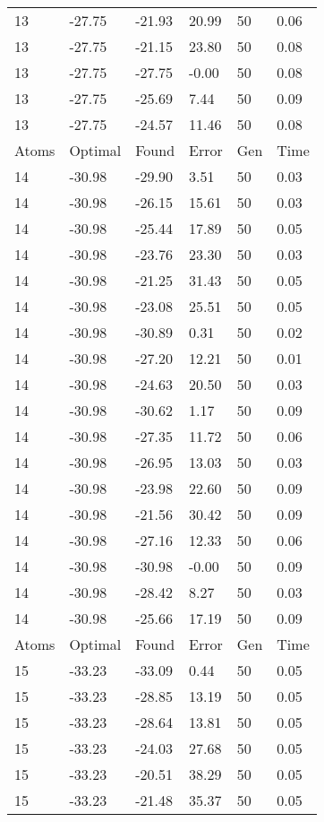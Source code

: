 \documentclass{report}
\begin{document}
\begin{appendix}
\begin{longtable}{llllll}
13 & -27.75 & -21.93 & 20.99 & 50 & 0.06 \\
13 & -27.75 & -21.15 & 23.80 & 50 & 0.08 \\
13 & -27.75 & -27.75 & -0.00 & 50 & 0.08 \\
13 & -27.75 & -25.69 & 7.44 & 50 & 0.09 \\
13 & -27.75 & -24.57 & 11.46 & 50 & 0.08 \\
Atoms & Optimal & Found & Error & Gen & Time \\
14 & -30.98 & -29.90 & 3.51 & 50 & 0.03 \\
14 & -30.98 & -26.15 & 15.61 & 50 & 0.03 \\
14 & -30.98 & -25.44 & 17.89 & 50 & 0.05 \\
14 & -30.98 & -23.76 & 23.30 & 50 & 0.03 \\
14 & -30.98 & -21.25 & 31.43 & 50 & 0.05 \\
14 & -30.98 & -23.08 & 25.51 & 50 & 0.05 \\
14 & -30.98 & -30.89 & 0.31 & 50 & 0.02 \\
14 & -30.98 & -27.20 & 12.21 & 50 & 0.01 \\
14 & -30.98 & -24.63 & 20.50 & 50 & 0.03 \\
14 & -30.98 & -30.62 & 1.17 & 50 & 0.09 \\
14 & -30.98 & -27.35 & 11.72 & 50 & 0.06 \\
14 & -30.98 & -26.95 & 13.03 & 50 & 0.03 \\
14 & -30.98 & -23.98 & 22.60 & 50 & 0.09 \\
14 & -30.98 & -21.56 & 30.42 & 50 & 0.09 \\
14 & -30.98 & -27.16 & 12.33 & 50 & 0.06 \\
14 & -30.98 & -30.98 & -0.00 & 50 & 0.09 \\
14 & -30.98 & -28.42 & 8.27 & 50 & 0.03 \\
14 & -30.98 & -25.66 & 17.19 & 50 & 0.09 \\
Atoms & Optimal & Found & Error & Gen & Time \\
15 & -33.23 & -33.09 & 0.44 & 50 & 0.05 \\
15 & -33.23 & -28.85 & 13.19 & 50 & 0.05 \\
15 & -33.23 & -28.64 & 13.81 & 50 & 0.05 \\
15 & -33.23 & -24.03 & 27.68 & 50 & 0.05 \\
15 & -33.23 & -20.51 & 38.29 & 50 & 0.05 \\
15 & -33.23 & -21.48 & 35.37 & 50 & 0.05 \\

\end{longtable}
\end{appendix}
\end{document}
